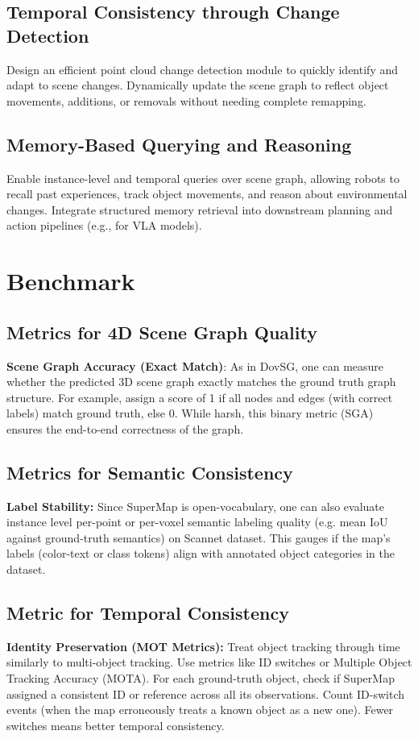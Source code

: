 \subsection{Temporal Consistency through Change Detection}
Design an efficient point cloud change detection module to quickly identify and adapt to scene changes. Dynamically update the scene graph to reflect object movements, additions, or removals without needing complete remapping.

\subsection{Memory-Based Querying and Reasoning}
Enable instance-level and temporal queries over scene graph, allowing robots to recall past experiences, track object movements, and reason about environmental changes.
Integrate structured memory retrieval into downstream planning and action pipelines (e.g., for VLA models).



\section{Benchmark}
\subsection{Metrics for 4D Scene Graph Quality}

\textbf{Scene Graph Accuracy (Exact Match)}: As in DovSG, one can measure whether the predicted 3D scene graph exactly matches the ground truth graph structure. For example, assign a score of 1 if all nodes and edges (with correct labels) match ground truth, else 0. While harsh, this binary metric (SGA) ensures the end-to-end correctness of the graph.

\subsection{Metrics for Semantic Consistency}
\textbf{Label Stability:} Since SuperMap is open-vocabulary, one can also evaluate instance level per-point or per-voxel semantic labeling quality (e.g. mean IoU against ground-truth semantics) on Scannet dataset\cite{dai2017scannet}. This gauges if the map’s labels (color-text or class tokens) align with annotated object categories in the dataset.

\subsection{Metric for Temporal Consistency}
\textbf{Identity Preservation (MOT Metrics):} Treat object tracking through time similarly to multi-object tracking. Use metrics like ID switches or Multiple Object Tracking Accuracy (MOTA). For each ground-truth object, check if SuperMap assigned a consistent ID or reference across all its observations. Count ID-switch events (when the map erroneously treats a known object as a new one). Fewer switches means better temporal consistency.


